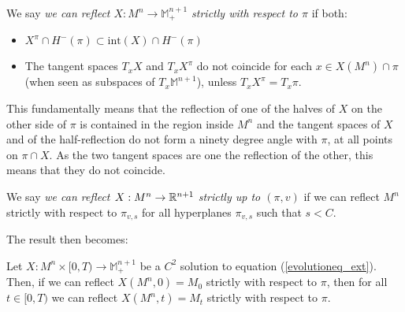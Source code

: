\begin{defin}
	We say {\em we can reflect $X: M^n\rightarrow \mathbb{M}^{n+1}_+$ strictly with respect to $\pi$} if both:
	\begin{itemize}
		\item $X^\pi\cap H^-(\pi)\subset \mathrm{int}(X)\cap H^-(\pi)$ 
		\item The tangent spaces $T_xX$ and $T_xX^\pi$ do not coincide for each $x\in X(M^n) \cap \pi$ (when seen as subspaces of  $T_x\mathbb{M}^{n+1}$), unless  $T_xX^\pi=T_x\pi$.
	\end{itemize} 
\end{defin}
This fundamentally means that the reflection of one of the halves of $X$ on the other side of $\pi$ is contained in the region inside $M^n$ and the tangent spaces of $X$ and of the half-reflection do not form a ninety degree angle with $\pi$, at all points on $\pi\cap X$. As the two tangent spaces are one the reflection of the other, this means that they do not coincide.   
\begin{defin}
	We say {\em we can reflect $X: M^n\rightarrow \mathbb{R}^{n+1}$ strictly up to $(\pi,v)$} if we can reflect $M^n$ strictly with respect to $\pi_{v, s}$ for all hyperplanes $\pi_{v, s}$ such that $s<C$.  
\end{defin}

The result then becomes:


\begin{theorem}\label{chow gulliver extended}
	Let $X:M^n\times [0,T) \rightarrow \mathbb{M}^{n+1}_+$ be a $C^2$ solution to equation (\ref{evolutioneq_ext}). Then, if we can reflect $X(M^n, 0)=M_0$ strictly with respect to $\pi$, then for all $t\in [0,T)$ we can reflect $X(M^n, t)=M_t$ strictly with respect to $\pi$. 
\end{theorem}

